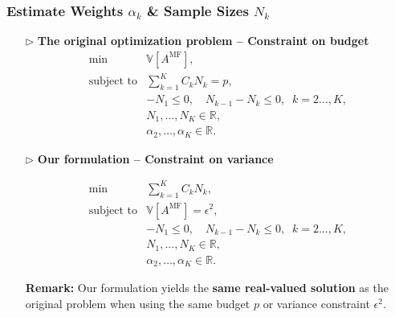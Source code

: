 \documentclass{beamer}
\begin{document}
\begin{frame}[t]
    \frametitle{Estimate Weights $\alpha_k$ \& Sample Sizes $N_k$}
    \begin{itemize}[leftmargin=5pt] 
     \vspace{3mm}
        \item[$\triangleright$] \textcolor{myblue3}{\bf The original optimization problem -- Constraint on budget}
        {\footnotesize
        \begin{equation*}\label{eq:Optimization_pb_sample_size}
            \begin{array}{ll}
            \min &\mathbb{V}\left[A^{\text{MF}}\right],\\
               \text{subject to} &\displaystyle\sum\limits_{k=1}^K C_kN_k=p,\\[2pt]
               &\displaystyle -N_1\le 0,\quad \displaystyle N_{k-1}-N_k\le 0, \;\; k=2\ldots,K,\\
               &N_1,\ldots, N_K\in \mathbb{R},\\
               &\alpha_2,\ldots,\alpha_K\in \mathbb{R}.
            \end{array}
        \end{equation*}
        }

        \item[$\triangleright$] \textcolor{myblue3}{\bf  Our formulation -- Constraint on variance}
        {\footnotesize
        \begin{equation*}\label{eq:Optimization_pb_sample_size}
            \begin{array}{ll}
            \min &\sum\limits_{k=1}^K C_kN_k,\\
            \text{subject to} &\displaystyle\mathbb{V}\left[A^{\text{MF}}\right]=\epsilon^2,\\[2pt]
               &\displaystyle -N_1\le 0,\quad \displaystyle N_{k-1}-N_k\le 0, \;\; k=2\ldots,K,\\
               &N_1,\ldots, N_K\in \mathbb{R},\\
               &\alpha_2,\ldots,\alpha_K\in \mathbb{R}.
            \end{array}
        \end{equation*}
        
        \textcolor{myred}{\bf Remark:} Our formulation yields the {\bf same real-valued solution} as the original problem when using the same budget $p$ or variance constraint $\epsilon^2$.
        }
        
    \end{itemize}
\end{frame}
\end{document}
